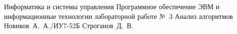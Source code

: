 \documentclass{bmstu}
\begin{document}
\makereporttitle
    {Информатика и системы управления}
    {Программное обеспечение ЭВМ и информационные технологии}
    {лабораторной работе №~3}
    {Анализ алгоритмов}
    {}
    {}
    {Новиков~А.~А./ИУ7-52Б}
    {Строганов~Д.~В.}

\tableofcontents







\makebibliography
\end{document}
